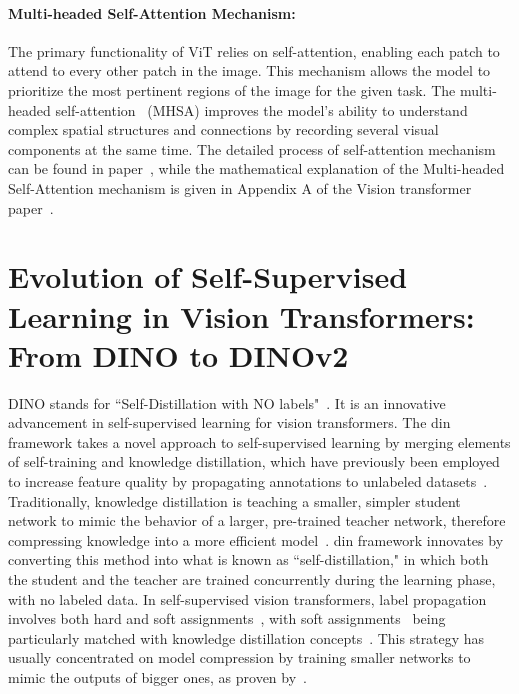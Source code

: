 
\paragraph{Multi-headed Self-Attention Mechanism:}
The primary functionality of ViT relies on self-attention, enabling each patch to attend to every other patch in the image. This mechanism allows the model to prioritize the most pertinent regions of the image for the given task. The multi-headed self-attention~\cite{Vaswani2017AttentionIA} (MHSA) improves the model's ability to understand complex spatial structures and connections by recording several visual components at the same time. The detailed process of self-attention mechanism can be found in paper~\cite{Vaswani2017AttentionIA}, while the mathematical explanation of the Multi-headed Self-Attention mechanism is given in Appendix A of the Vision transformer paper~\cite{Vit_Paper_Dosovitskiy2020AnII}.

\section{Evolution of Self-Supervised Learning in Vision Transformers: From DINO to DINOv2}
DINO stands for ``Self-Distillation with NO labels"~\citep{dino_caron2021emerging}. It is an innovative advancement in self-supervised learning for vision transformers. The \gls{din} framework takes a novel approach to self-supervised learning by merging elements of self-training and knowledge distillation, which have previously been employed to increase feature quality by propagating annotations to unlabeled datasets~\citep{dino_caron2021emerging, _35_kn_distill_hinton2015distilling}. Traditionally, knowledge distillation is teaching a smaller, simpler student network to mimic the behavior of a larger, pre-trained teacher network, therefore compressing knowledge into a more efficient model~\citep{_7_modelcompr_buciluǎ2006model, knowdledge_distill_2017_kim2017transferring, dino_caron2021emerging}. \gls{din} framework innovates by converting this method into what is known as ``self-distillation," in which both the student and the teacher are trained concurrently during the learning phase, with no labeled data. In self-supervised vision transformers, label propagation involves both hard and soft assignments~\citep{_41_pseudo_label_semi_sup_lee2013pseudo,_78_plabel_speech_xu2020iterative,_79_billion_scale_yalniz2019billion, _76_seftraining_xie2020self}, with soft assignments~\citep{_76_seftraining_xie2020self} being particularly matched with knowledge distillation concepts~\citep{_7_modelcompr_buciluǎ2006model,_35_kn_distill_hinton2015distilling}. This strategy has usually concentrated on model compression by training smaller networks to mimic the outputs of bigger ones, as proven by~\citet{_76_seftraining_xie2020self}.

